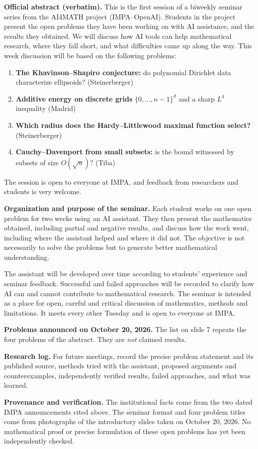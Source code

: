 \medskip\noindent
\textbf{Official abstract (verbatim).}
This is the first session of a biweekly
seminar series from the AI4MATH project
(IMPA--OpenAI). Students in the project
present the open problems they have been
working on with AI assistance, and the
results they obtained. We will discuss how
AI tools can help mathematical research,
where they fall short, and what difficulties
came up along the way. This week discussion
will be based on the following problems:

\begin{enumerate}
\item \textbf{The Khavinson--Shapiro
conjecture:} do polynomial Dirichlet data
characterize ellipsoids? (Steinerberger)
\item \textbf{Additive energy on discrete
grids} $\{0,\ldots,n-1\}^d$ and a sharp
$L^4$ inequality (Madrid)
\item \textbf{Which radius does the
Hardy--Littlewood maximal function select?}
(Steinerberger)
\item \textbf{Cauchy--Davenport from small
subsets:} is the bound witnessed by subsets
of size $O(\sqrt{n})$? (Tiba)
\end{enumerate}

The session is open to everyone at IMPA, and
feedback from researchers and students is
very welcome.

\medskip\noindent
\textbf{Organization and purpose of the
seminar.}
Each student works on one open problem for
two weeks using an AI assistant. They then
present the mathematics obtained, including
partial and negative results, and discuss how
the work went, including where the assistant
helped and where it did not. The objective is
not necessarily to solve the problems but to
generate better mathematical understanding.

The assistant will be developed over time
according to students' experience and seminar
feedback. Successful and failed approaches
will be recorded to clarify how AI can and
cannot contribute to mathematical research.
The seminar is intended as a place for open,
careful and critical discussion of
mathematics, methods and limitations. It
meets every other Tuesday and is open to
everyone at IMPA.

\medskip\noindent
\textbf{Problems announced on October 20,
2026.} The list on slide 7 repeats the four
problems of the abstract. They are
\emph{not} claimed results.

\medskip\noindent
\textbf{Research log.}
For future meetings, record the precise
problem statement and its published source,
methods tried with the assistant, proposed
arguments and counterexamples, independently
verified results, failed approaches, and what
was learned.

\medskip\noindent
\textbf{Provenance and verification.}
The institutional facts come from the two
dated IMPA announcements cited above. The
seminar format and four problem titles come
from photographs of the introductory slides
taken on October 20, 2026. No mathematical
proof or precise formulation of these open
problems has yet been independently checked.





